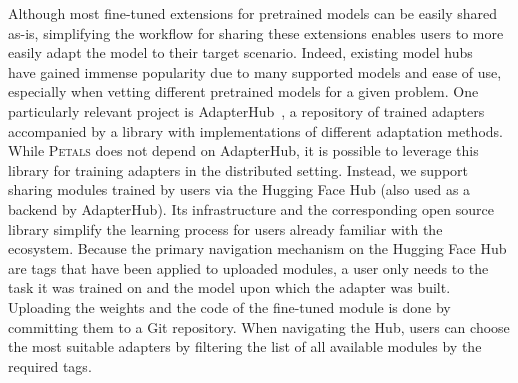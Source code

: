 Although most fine-tuned extensions for pretrained models can be easily shared as-is, simplifying the workflow for sharing these extensions enables users to more easily adapt the model to their target scenario. Indeed, existing model hubs~\citep{wolf-etal-2020-transformers, tfhub, torchhub} have gained immense popularity due to many supported models and ease of use, especially when vetting different pretrained models for a given problem. One particularly relevant project is AdapterHub~\citep{adapterhub}, a repository of trained adapters accompanied by a library with implementations of different adaptation methods. While \textsc{Petals} does not depend on AdapterHub, it is possible to leverage this library for training adapters in the distributed setting.
Instead, we support sharing modules trained by users via the Hugging Face Hub (also used as a backend by AdapterHub). Its infrastructure and the corresponding open source library simplify the learning process for users already familiar with the ecosystem. Because the primary navigation mechanism on the Hugging Face Hub are tags that have been applied to uploaded modules, a user only needs to the task it was trained on and the model upon which the adapter was built. Uploading the weights and the code of the fine-tuned module is done by committing them to a Git repository.
When navigating the Hub, users can choose the most suitable adapters by filtering the list of all available modules by the required tags.